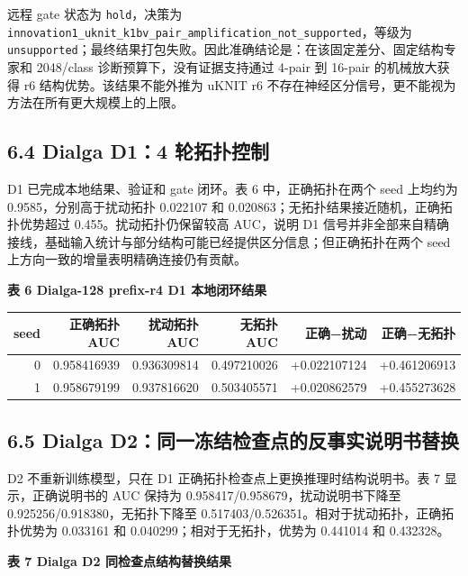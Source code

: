 \documentclass[
  a4paper,
  UTF8]{ctexart}
\begin{document}
远程 gate 状态为 \texttt{hold}，决策为
\nolinkurl{innovation1_uknit_k1bv_pair_amplification_not_supported}，等级为
\texttt{unsupported}；最终结果打包失败。因此准确结论是：在该固定差分、固定结构专家和
2048/class 诊断预算下，没有证据支持通过 4-pair 到 16-pair 的机械放大获得
r6 结构优势。该结果不能外推为 uKNIT r6
不存在神经区分信号，更不能视为方法在所有更大规模上的上限。

\hypertarget{dialga-d14-ux8f6eux62d3ux6251ux63a7ux5236}{%
\subsection{6.4 Dialga D1：4
轮拓扑控制}\label{dialga-d14-ux8f6eux62d3ux6251ux63a7ux5236}}

D1 已完成本地结果、验证和 gate 闭环。表 6 中，正确拓扑在两个 seed
上均约为 0.9585，分别高于扰动拓扑 0.022107 和
0.020863；无拓扑结果接近随机，正确拓扑优势超过 0.455。扰动拓扑仍保留较高
AUC，说明 D1
信号并非全部来自精确接线，基础输入统计与部分结构可能已经提供区分信息；但正确拓扑在两个
seed 上方向一致的增量表明精确连接仍有贡献。

\textbf{表 6 Dialga-128 prefix-r4 D1 本地闭环结果}

\begin{longtable}[]{@{}rrrrrr@{}}
\toprule
seed & 正确拓扑 AUC & 扰动拓扑 AUC & 无拓扑 AUC & 正确−扰动 &
正确−无拓扑\tabularnewline
\midrule
\endhead
0 & 0.958416939 & 0.936309814 & 0.497210026 & +0.022107124 &
+0.461206913\tabularnewline
1 & 0.958679199 & 0.937816620 & 0.503405571 & +0.020862579 &
+0.455273628\tabularnewline
\bottomrule
\end{longtable}

\hypertarget{dialga-d2ux540cux4e00ux51bbux7ed3ux68c0ux67e5ux70b9ux7684ux53cdux4e8bux5b9eux8bf4ux660eux4e66ux66ffux6362}{%
\subsection{6.5 Dialga
D2：同一冻结检查点的反事实说明书替换}\label{dialga-d2ux540cux4e00ux51bbux7ed3ux68c0ux67e5ux70b9ux7684ux53cdux4e8bux5b9eux8bf4ux660eux4e66ux66ffux6362}}

D2 不重新训练模型，只在 D1 正确拓扑检查点上更换推理时结构说明书。表 7
显示，正确说明书的 AUC 保持为 0.958417/0.958679，扰动说明书下降至
0.925256/0.918380，无拓扑下降至
0.517403/0.526351。相对于扰动拓扑，正确拓扑优势为 0.033161 和
0.040299；相对于无拓扑，优势为 0.441014 和 0.432328。

\textbf{表 7 Dialga D2 同检查点结构替换结果}
\end{document}
